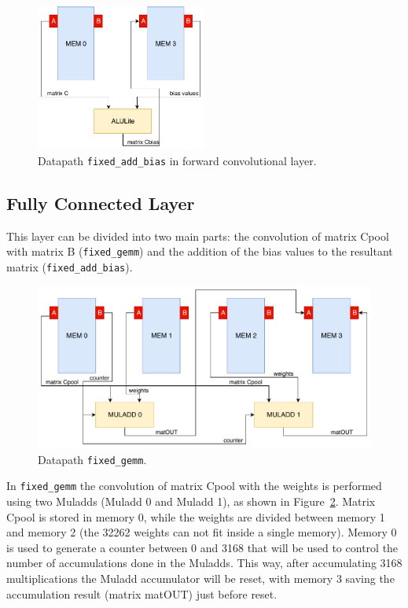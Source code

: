 \begin{figure}[!htb]
	\centering
	\includegraphics[width=0.5\textwidth]{Figures/fixed_add_bias.pdf}
	\caption{Datapath {\tt fixed\_add\_bias} in forward convolutional layer.}
	\label{fig:fixed_add_bias}
\end{figure}

\subsection{Fully Connected Layer}
\label{subsection:fconnlayer}

This layer can be divided into two main parts: the convolution of matrix Cpool
with matrix B ({\tt fixed\_gemm}) and the addition of the bias values to
the resultant matrix ({\tt fixed\_add\_bias}).

\begin{figure}[!htb]
	\centering
	\includegraphics[width=1\textwidth]{Figures/fixed_gemm.pdf}
	\caption{Datapath {\tt fixed\_gemm}.}
	\label{fig:fixed_gemm}
\end{figure}

In {\tt fixed\_gemm} the convolution of matrix Cpool with the weights is
performed using two Muladds (Muladd 0 and Muladd 1), as shown in
Figure~\ref{fig:fixed_gemm}. Matrix Cpool is stored in memory 0, while the
weights are divided between memory 1 and memory 2 (the 32262 weights can not fit
inside a single memory). Memory 0 is used to generate a counter between 0
and 3168 that will be used to control the number of accumulations done in the
Muladds. This way, after accumulating 3168 multiplications the Muladd
accumulator will be reset, with memory 3 saving the accumulation result (matrix
matOUT) just before reset.

